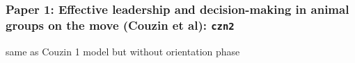 \documentclass[compress]{beamer}
\begin{document}
\begin{frame}
  \frametitle{Paper 1: Effective leadership and decision-making in animal groups on the move (Couzin et al): \texttt{czn2}}
 
 same as Couzin 1 model but without orientation phase
%
%
%
%
%
\end{frame}
\end{document}

